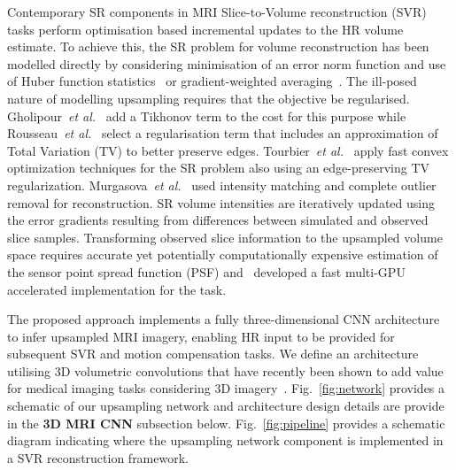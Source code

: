 \documentclass[runningheads,a4paper]{llncs}
\makeatletter
\let\origsection\section
\renewcommand\section{\@ifstar{\starsection}{\nostarsection}}
\newcommand\nostarsection[1]
{\sectionprelude\origsection{#1}\sectionpostlude}
\newcommand\starsection[1]
{\sectionprelude\origsection*{#1}\sectionpostlude}
\newcommand\sectionprelude{%
  \vspace{-2mm}
}
\newcommand\sectionpostlude{%
  \vspace{0mm}
}
\makeatother
\begin{document}
Contemporary SR components in MRI Slice-to-Volume reconstruction (SVR) tasks perform optimisation based incremental updates to the HR volume estimate. To achieve this, the SR problem for volume reconstruction has been modelled directly by considering minimisation of an error norm function and use of Huber function statistics~\cite{gholipour2010robust} or gradient-weighted averaging~\cite{kim2010intersection}. The ill-posed nature of modelling upsampling requires that the objective be regularised. Gholipour~\emph{et al.}~\cite{gholipour2010robust} add a Tikhonov term to the cost for this purpose while Rousseau~\emph{et al.}~\cite{Rousseau2010,rousseau2006registration,Rousseau2013} select a regularisation term that includes an approximation of Total Variation (TV) to better preserve edges. Tourbier~\emph{et al.}~\cite{tourbier2015efficient} apply fast convex optimization techniques for the SR problem also using an edge-preserving TV regularization. Murgasova~\emph{et al.}~\cite{Kuklisova-Murgasova2012} used intensity matching and complete outlier removal for reconstruction. SR volume intensities are iteratively updated using the error gradients resulting from differences between simulated and observed slice samples. Transforming observed slice information to the upsampled volume space requires accurate yet potentially computationally expensive estimation of the sensor point spread function (PSF) and~\cite{kainz2015fast} developed a fast multi-GPU accelerated implementation for the task. 


\vspace{-2mm}
\section{Method} 
\vspace{-1mm}
\label{sec:method}
The proposed approach implements a fully three-dimensional CNN architecture to infer upsampled MRI imagery, enabling HR input to be provided for subsequent SVR and motion compensation tasks. We define an architecture utilising 3D volumetric convolutions that have recently been shown to add value for medical imaging tasks considering 3D imagery~\cite{Kamnitsas2016deepmedic,Cciccek20163d}. Fig.~\ref{fig:network} provides a schematic of our upsampling network and architecture design details are provide in the \textbf{3D MRI CNN} subsection below. Fig.~\ref{fig:pipeline} provides a schematic diagram indicating where the upsampling network component is implemented in a SVR reconstruction framework.
\end{document}
